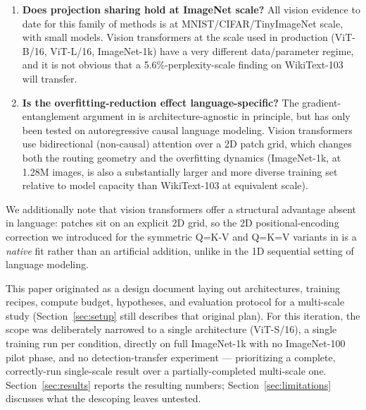 \documentclass[11pt]{article}
\begin{document}
\begin{enumerate}
    \item \textbf{Does projection sharing hold at ImageNet scale?} All
    vision evidence to date for this family of methods is at
    MNIST/CIFAR/TinyImageNet scale, with small models. Vision transformers
    at the scale used in production (ViT-B/16, ViT-L/16, ImageNet-1k) have
    a very different data/parameter regime, and it is not obvious that a
    5.6\%-perplexity-scale finding on WikiText-103 will transfer.
    \item \textbf{Is the overfitting-reduction effect language-specific?}
    The gradient-entanglement argument in \citet{gao2026keyless} is
    architecture-agnostic in principle, but has only been tested on
    autoregressive causal language modeling. Vision transformers use
    bidirectional (non-causal) attention over a 2D patch grid, which
    changes both the routing geometry and the overfitting dynamics
    (ImageNet-1k, at 1.28M images, is also a substantially larger and more
    diverse training set relative to model capacity than WikiText-103 at
    equivalent scale).
\end{enumerate}

We additionally note that vision transformers offer a structural advantage
absent in language: patches sit on an explicit 2D grid, so the 2D
positional-encoding correction we introduced for the symmetric Q=K-V and
Q=K=V variants in \citet{kayyam2026three} is a \emph{native} fit rather than
an artificial addition, unlike in the 1D sequential setting of language
modeling.

This paper originated as a design document laying out architectures,
training recipes, compute budget, hypotheses, and evaluation protocol for a
multi-scale study (Section~\ref{sec:setup} still describes that original
plan). For this iteration, the scope was deliberately narrowed to a single
architecture (ViT-S/16), a single training run per condition, directly on
full ImageNet-1k with no ImageNet-100 pilot phase, and no detection-transfer
experiment --- prioritizing a complete, correctly-run single-scale result
over a partially-completed multi-scale one. Section~\ref{sec:results} reports
the resulting numbers; Section~\ref{sec:limitations} discusses what the
descoping leaves untested.
\end{document}
